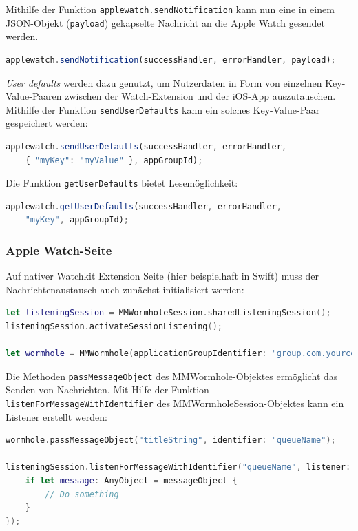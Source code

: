 Mithilfe der Funktion \texttt{applewatch.sendNotification} kann nun eine in einem JSON-Objekt (\texttt{payload}) gekapselte Nachricht an die Apple Watch gesendet werden.  
\begin{lstlisting}[language=JavaScript]
applewatch.sendNotification(successHandler, errorHandler, payload);
\end{lstlisting}

\emph{User defaults} werden dazu genutzt, um Nutzerdaten in Form von einzelnen Key-Value-Paaren zwischen der Watch-Extension und der iOS-App auszutauschen. Mithilfe der Funktion \texttt{sendUserDefaults} kann ein solches Key-Value-Paar gespeichert werden:
\begin{lstlisting}[language=JavaScript, breaklines=true]
applewatch.sendUserDefaults(successHandler, errorHandler, 
    { "myKey": "myValue" }, appGroupId);
\end{lstlisting}
Die Funktion \texttt{getUserDefaults} bietet Lesemöglichkeit:
\begin{lstlisting}[language=JavaScript]
applewatch.getUserDefaults(successHandler, errorHandler, 
    "myKey", appGroupId);
\end{lstlisting}
%
%
%
\subsubsection{Apple Watch-Seite}
Auf nativer Watchkit Extension Seite (hier beispielhaft in Swift) muss der Nachrichtenaustausch auch zunächst initialisiert werden:
\begin{lstlisting}[language=swift, breaklines=true]
let listeningSession = MMWormholeSession.sharedListeningSession();
listeningSession.activateSessionListening();

let wormhole = MMWormhole(applicationGroupIdentifier: "group.com.yourcompany", optionalDirectory: nil, transitingType: .SessionContext);
\end{lstlisting}

Die Methoden \texttt{passMessageObject} des MMWormhole-Objektes ermöglicht das Senden von Nachrichten. Mit Hilfe der Funktion \texttt{listenForMessageWithIdentifier} des MMWormholeSession-Objektes kann ein Listener erstellt werden:
\begin{lstlisting}[language=swift, breaklines=true]
wormhole.passMessageObject("titleString", identifier: "queueName");

listeningSession.listenForMessageWithIdentifier("queueName", listener: { (messageObject) -> Void in
    if let message: AnyObject = messageObject {
        // Do something
    }
});
\end{lstlisting}


